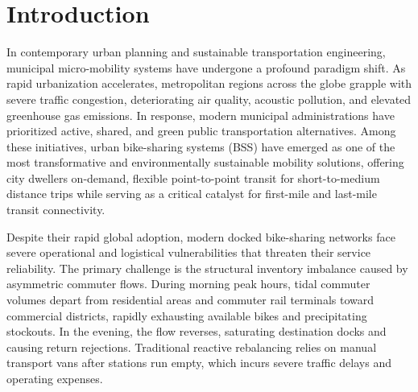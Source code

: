\documentclass[12pt, a4paper]{article}
\renewcommand{\_}{\textunderscore\allowbreak}
\renewcommand{\headrulewidth}{1.0pt}
\renewcommand{\footrulewidth}{1.0pt}
\renewcommand{\headrulewidth}{0pt}%
\renewcommand{\footrulewidth}{0pt}%
\renewcommand{\headrulewidth}{1.0pt}%
\renewcommand{\footrulewidth}{1.0pt}%
\begin{document}
\listoffigures
{}

\newpage

\clearpage
\begingroup
\pagestyle{empty}
\tableofcontents
\thispagestyle{empty}
\clearpage
\endgroup

\setcounter{page}{1}
\pagestyle{fancy}
\fancyhf{}
\fancyfoot[R]{\rmfamily\fontsize{11pt}{13pt}\selectfont \thepage}
\renewcommand{\headrulewidth}{1.0pt}
\renewcommand{\footrulewidth}{1.0pt}
\thispagestyle{fancy}

\section{Introduction}
\thispagestyle{fancy}

In contemporary urban planning and sustainable transportation engineering, municipal micro-mobility systems have undergone a profound paradigm shift. As rapid urbanization accelerates, metropolitan regions across the globe grapple with severe traffic congestion, deteriorating air quality, acoustic pollution, and elevated greenhouse gas emissions. In response, modern municipal administrations have prioritized active, shared, and green public transportation alternatives. Among these initiatives, urban bike-sharing systems (BSS) have emerged as one of the most transformative and environmentally sustainable mobility solutions, offering city dwellers on-demand, flexible point-to-point transit for short-to-medium distance trips while serving as a critical catalyst for first-mile and last-mile transit connectivity.

Despite their rapid global adoption, modern docked bike-sharing networks face severe operational and logistical vulnerabilities that threaten their service reliability. The primary challenge is the structural inventory imbalance caused by asymmetric commuter flows. During morning peak hours, tidal commuter volumes depart from residential areas and commuter rail terminals toward commercial districts, rapidly exhausting available bikes and precipitating stockouts. In the evening, the flow reverses, saturating destination docks and causing return rejections. Traditional reactive rebalancing relies on manual transport vans after stations run empty, which incurs severe traffic delays and operating expenses.
\end{document}
